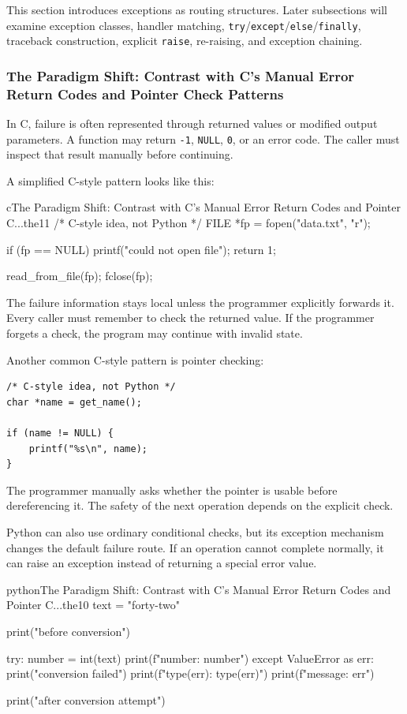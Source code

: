 \documentclass[a4paper,twoside]{report}
\begin{document}
This section introduces exceptions as routing structures. Later subsections will examine exception classes, handler matching, \texttt{try}/\texttt{except}/\texttt{else}/\texttt{finally}, traceback construction, explicit \texttt{raise}, re-raising, and exception chaining.

\subsubsection{The Paradigm Shift: Contrast with C's Manual Error Return Codes and Pointer Check Patterns}

In C, failure is often represented through returned values or modified output parameters. A function may return \texttt{-1}, \texttt{NULL}, \texttt{0}, or an error code. The caller must inspect that result manually before continuing.

A simplified C-style pattern looks like this:

\begin{codebox}[]{c}{The Paradigm Shift: Contrast with C's Manual Error Return Codes and Pointer C...}{the11}
/* C-style idea, not Python */
FILE *fp = fopen("data.txt", "r");

if (fp == NULL) {
    printf("could not open file\n");
    return 1;
}

read_from_file(fp);
fclose(fp);
\end{codebox}


The failure information stays local unless the programmer explicitly forwards it. Every caller must remember to check the returned value. If the programmer forgets a check, the program may continue with invalid state.

Another common C-style pattern is pointer checking:

\begin{verbatim}
/* C-style idea, not Python */
char *name = get_name();

if (name != NULL) {
    printf("%s\n", name);
}
\end{verbatim}

The programmer manually asks whether the pointer is usable before dereferencing it. The safety of the next operation depends on the explicit check.

Python can also use ordinary conditional checks, but its exception mechanism changes the default failure route. If an operation cannot complete normally, it can raise an exception instead of returning a special error value.

\begin{codebox}[]{python}{The Paradigm Shift: Contrast with C's Manual Error Return Codes and Pointer C...}{the10}
text = "forty-two"

print("before conversion")

try:
    number = int(text)
    print(f"number: {number}")
except ValueError as err:
    print("conversion failed")
    print(f"type(err): {type(err)}")
    print(f"message: {err}")

print("after conversion attempt")
\end{codebox}
\end{document}
